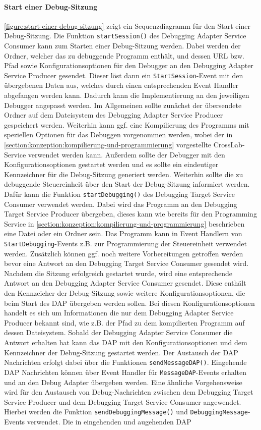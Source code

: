 \paragraph{Start einer Debug-Sitzung} \autoref{figure:start-einer-debug-sitzung} zeigt ein Sequenzdiagramm für den Start einer Debug-Sitzung. Die Funktion \texttt{startSession()} des Debugging Adapter Service Consumer kann zum Starten einer Debug-Sitzung werden. Dabei werden der Ordner, welcher das zu debuggende Programm enthält, und dessen URL bzw. Pfad sowie Konfigurationsoptionen für den Debugger an den Debugging Adapter Service Producer gesendet. Dieser löst dann ein \texttt{StartSession}-Event mit den übergebenen Daten aus, welches durch einen entsprechenden Event Handler abgefangen werden kann. Dadurch kann die Implementierung an den jeweiligen Debugger angepasst werden. Im Allgemeinen sollte zunächst der übersendete Ordner auf dem Dateisystem des Debugging Adapter Service Producer gespeichert werden. Weiterhin kann ggf. eine Kompilierung des Programms mit speziellen Optionen für das Debuggen vorgenommen werden, wobei der in \autoref{section:konzeption:kompilierung-und-programmierung} vorgestellte CrossLab-Service verwendet werden kann. Außerdem sollte der Debugger mit den Konfigurationsoptionen gestartet werden und es sollte ein eindeutiger Kennzeichner für die Debug-Sitzung generiert werden. Weiterhin sollte die zu debuggende Steuereinheit über den Start der Debug-Sitzung informiert werden. Dafür kann die Funktion \texttt{startDebugging()} des Debugging Target Service Consumer verwendet werden. Dabei wird das Programm an den Debugging Target Service Producer übergeben, dieses kann wie bereits für den Programming Service in \autoref{section:konzeption:kompilierung-und-programmierung} beschrieben eine Datei oder ein Ordner sein. Das Programm kann in Event Handlern von \texttt{StartDebugging}-Events z.B. zur Programmierung der Steuereinheit verwendet werden. Zusätzlich können ggf. noch weitere Vorbereitungen getroffen werden bevor eine Antwort an den Debugging Target Service Consumer gesendet wird. Nachdem die Sitzung erfolgreich gestartet wurde, wird eine entsprechende Antwort an den Debugging Adapter Service Consumer gesendet. Diese enthält den Kennzeicher der Debug-Sitzung sowie weitere Konfigurationsoptionen, die beim Start des \ac{DAP} übergeben werden sollen. Bei diesen Konfigurationsoptionen handelt es sich um Informationen die nur dem Debugging Adapter Service Producer bekannt sind, wie z.B. der Pfad zu dem kompilierten Programm auf dessen Dateisystem. Sobald der Debugging Adapter Service Consumer die Antwort erhalten hat kann das \ac{DAP} mit den Konfigurationsoptionen und dem Kennzeichner der Debug-Sitzung gestartet werden. Der Austausch der \ac{DAP} Nachrichten erfolgt dabei über die Funktionen \texttt{sendMessageDAP()}. Eingehende \ac{DAP} Nachrichten können über Event Handler für \texttt{MessageDAP}-Events erhalten und an den Debug Adapter übergeben werden. Eine ähnliche Vorgehensweise wird für den Austausch von Debug-Nachrichten zwischen dem Debugging Target Service Producer und dem Debugging Target Service Consumer angewendet. Hierbei werden die Funktion \texttt{sendDebuggingMessage()} und \texttt{DebuggingMessage}-Events verwendet. Die in eingehenden und augehenden DAP 